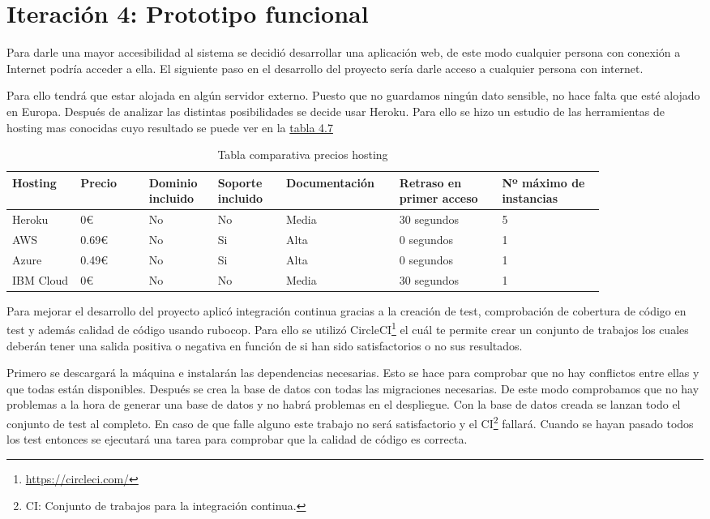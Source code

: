 \section{Iteración 4: Prototipo funcional}

Para darle una mayor accesibilidad al sistema se decidió desarrollar
una aplicación web, de este modo cualquier persona con conexión a
Internet podría acceder a ella. El siguiente paso en el desarrollo
del proyecto sería darle acceso a cualquier persona con internet.

Para ello tendrá que estar alojada en algún servidor externo.
Puesto que no guardamos ningún dato sensible, no hace falta
que esté alojado en Europa. Después de analizar las distintas posibilidades
se decide usar Heroku. Para ello se hizo un estudio de las herramientas
de hosting mas conocidas cuyo resultado se puede ver en la \hyperref[tab:Tabla comparativa precios hosting]{tabla 4.7}

\begin{longtable}{|p{0.1\linewidth}p{0.1\linewidth}p{0.1\linewidth}p{0.1\linewidth}p{0.15\linewidth}p{0.15\linewidth}p{0.15\linewidth}|}
  \caption{Tabla comparativa precios hosting}
  \label{tab:Tabla comparativa precios hosting}
  \endfirsthead
  \endhead
  \hline
  \multicolumn{1}{|l}{Hosting} & Precio & Dominio incluido & Soporte incluido & Documentación & Retraso en primer acceso & Nº máximo de instancias \\ \hline
  Heroku & 0€ & No & No & Media & 30 segundos & 5 \\ \hline
  AWS & 0.69€ & No & Si & Alta & 0 segundos & 1 \\ \hline
  Azure & 0.49€ & No & Si & Alta & 0 segundos & 1 \\ \hline
  IBM Cloud & 0€ & No & No & Media & 30 segundos & 1 \\ \hline
\end{longtable}

Para mejorar el desarrollo del proyecto aplicó integración continua gracias
a la creación de test, comprobación de cobertura de código en test y además
calidad de código usando rubocop. Para ello se utilizó CircleCI\footnote{\url{https://circleci.com/}} el cuál te
permite crear un conjunto de trabajos los cuales deberán tener una salida
positiva o negativa en función de si han sido satisfactorios o no sus resultados.

Primero se descargará la máquina e instalarán las dependencias necesarias.
Esto se hace para comprobar que no hay conflictos entre ellas y que todas
están disponibles. Después se crea la base de datos con todas las migraciones
necesarias. De este modo comprobamos que no hay problemas a la hora
de generar una base de datos y no habrá problemas en el despliegue.
Con la base de datos creada se lanzan todo el conjunto de test al completo.
En caso de que falle alguno este trabajo no será satisfactorio y el CI\footnote{CI: Conjunto de trabajos para la integración continua.}
fallará. Cuando se hayan pasado todos los test entonces se ejecutará
una tarea para comprobar que la calidad de código es correcta.

